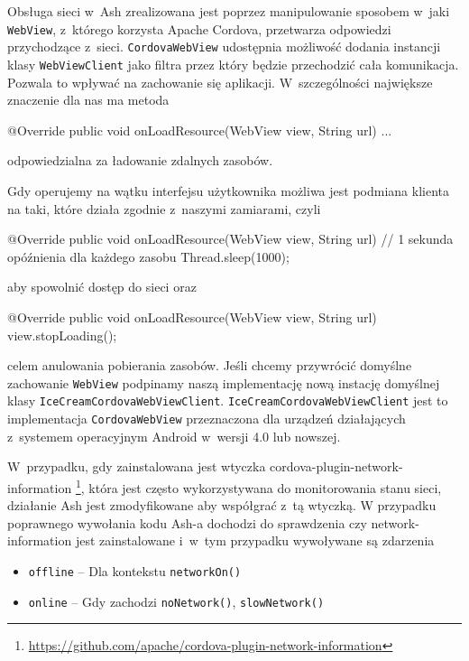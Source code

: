 \documentclass[brudnopis]{xmgr}
\begin{document}
Obsługa sieci w~Ash zrealizowana jest poprzez manipulowanie sposobem w~jaki \texttt{WebView}, z~którego korzysta Apache Cordova, przetwarza odpowiedzi przychodzące z~sieci. \texttt{CordovaWebView} udostępnia możliwość dodania instancji klasy \texttt{WebViewClient} jako filtra przez który będzie przechodzić cała komunikacja. Pozwala to wpływać na zachowanie się aplikacji. W~szczególności największe znaczenie dla nas ma metoda

\begin{javacode}
   @Override
   public void onLoadResource(WebView view, String url) {
       ...
   }
\end{javacode}

odpowiedzialna za ładowanie zdalnych zasobów.

Gdy operujemy na wątku interfejsu użytkownika możliwa jest podmiana klienta na taki, które działa zgodnie z~naszymi zamiarami, czyli 

\begin{javacode}
   @Override
   public void onLoadResource(WebView view, String url) {
       // 1 sekunda opóźnienia dla każdego zasobu
       Thread.sleep(1000); 
   }
\end{javacode}

aby spowolnić dostęp do sieci oraz

\begin{javacode}
   @Override
   public void onLoadResource(WebView view, String url) {
       view.stopLoading();
   }
\end{javacode}

celem anulowania pobierania zasobów. Jeśli chcemy przywrócić domyślne zachowanie \texttt{WebView} podpinamy naszą implementację nową instację domyślnej klasy \texttt{IceCreamCordovaWebViewClient}. \texttt{IceCreamCordovaWebViewClient} jest to implementacja \texttt{CordovaWebView} przeznaczona dla urządzeń działających z~systemem operacyjnym Android w~wersji 4.0 lub nowszej.

W~przypadku, gdy zainstalowana jest wtyczka cordova-plugin-network-information \footnote{ \url{https://github.com/apache/cordova-plugin-network-information} }, która jest często wykorzystywana do monitorowania stanu sieci, działanie Ash jest zmodyfikowane aby współgrać z~tą wtyczką. W przypadku poprawnego wywołania kodu Ash-a dochodzi do sprawdzenia czy network-information jest zainstalowane i~w~tym przypadku wywoływane są zdarzenia

\begin{itemize}
  \item \texttt{offline} -- Dla kontekstu \texttt{networkOn()} 
  \item \texttt{online} -- Gdy zachodzi \texttt{noNetwork()}, \texttt{slowNetwork()}
\end{itemize}
\end{document}
